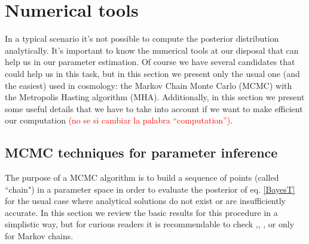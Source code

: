 \documentclass[onecolumn,           %
               showpacs,            %
               preprintnumbers,     %
               aps,                 %
               prl,          	    %
               letterpaper,             %
               superscriptaddress,      %
               nofootinbib,         %
               tightenlines,        %
               floats,floatfix      %
               ,usenatbib,
               ]{revtex4-1}
\begin{document}

%

\section{Numerical tools}

In a typical scenario it's not possible to compute the posterior distribution analytically. It's important to know the numerical tools at our disposal that can help us in our parameter estimation. Of course we have several candidates that could help us in this task, but in this section we present only the usual one (and the easiest) used in cosmology: the Markov Chain Monte Carlo (MCMC) with the Metropolis Hasting algorithm (MHA). Additionally, in this section we present some useful details that we have to take into account if we want to make efficient our computation \textcolor{red}{(no se si cambiar la palabra ``computation'')}. 

\subsection{MCMC techniques for parameter inference}

The purpose of a MCMC algorithm is to build a sequence of points (called ``chain") in a parameter space in order to evaluate the posterior of eq. \eqref{BayesT} for the usual case where analytical solutions do not exist or are insufficiently accurate. In this section we review the basic results for this procedure in a simplistic way, but for curious readers it is recommendable to check \cite{mcmc1},\cite{mcmc2}, \cite{mcmc3}, or \cite{mcmc4} only for Markov chains.
\end{document}
